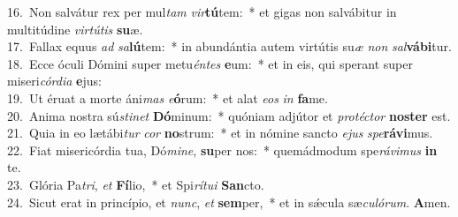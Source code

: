 {16.~}Non salvátur rex per mul\textit{tam} \textit{vir}\textbf{tú}tem:~* et gigas non salvábitur in multitúdine \textit{vir}\textit{tú}\textit{tis} \textbf{su}æ.\\
{17.~}Fallax equus \textit{ad} \textit{sa}\textbf{lú}tem:~* in abundántia autem virtútis su\textit{æ} \textit{non} \textit{sal}\textbf{vá}\textbf{bi}tur.\\
{18.~}Ecce óculi Dómini super metu\textit{én}\textit{tes} \textbf{e}um:~* et in eis, qui sperant super miseri\textit{cór}\textit{di}\textit{a} \textbf{e}jus:\\
{19.~}Ut éruat a morte áni\textit{mas} \textit{e}\textbf{ó}rum:~* et alat \textit{e}\textit{os} \textit{in} \textbf{fa}me.\\
{20.~}Anima nostra sú\textit{sti}\textit{net} \textbf{Dó}minum:~* quóniam adjútor et \textit{pro}\textit{té}\textit{ctor} \textbf{no}\textbf{ster} est.\\
{21.~}Quia in eo lætábi\textit{tur} \textit{cor} \textbf{no}strum:~* et in nómine sancto \textit{e}\textit{jus} \textit{spe}\textbf{rá}\textbf{vi}mus.\\
{22.~}Fiat misericórdia tua, Dó\textit{mi}\textit{ne}, \textbf{su}per nos:~* quemádmodum spe\textit{rá}\textit{vi}\textit{mus} \textbf{in} te.\\
{23.~}Glória Pa\textit{tri}, \textit{et} \textbf{Fí}lio,~* et Spi\textit{rí}\textit{tu}\textit{i} \textbf{San}cto.\\
{24.~}Sicut erat in princípio, et \textit{nunc}, \textit{et} \textbf{sem}per,~* et in sǽcula sæ\textit{cu}\textit{ló}\textit{rum}. \textbf{A}men.\\

